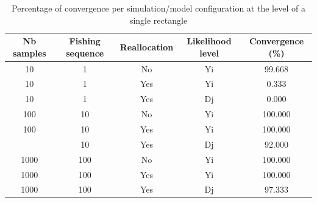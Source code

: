 \documentclass[
  english,
  man]{apa6}
\begin{document}
\begin{table}

\caption{\label{tab:unnamed-chunk-2}Percentage of convergence per simulation/model configuration at the level of a single rectangle}
\centering
\begin{tabular}[t]{ccccc}
\toprule
Nb samples & Fishing sequence & Reallocation & Likelihood level & Convergence (\%)\\
\midrule
10 & 1 & No & Yi & 99.668\\
10 & 1 & Yes & Yi & 0.333\\
10 & 1 & Yes & Dj & 0.000\\
100 & 10 & No & Yi & 100.000\\
100 & 10 & Yes & Yi & 100.000\\
\addlinespace
100 & 10 & Yes & Dj & 92.000\\
1000 & 100 & No & Yi & 100.000\\
1000 & 100 & Yes & Yi & 100.000\\
1000 & 100 & Yes & Dj & 97.333\\
\bottomrule
\end{tabular}
\end{table}
\end{document}
